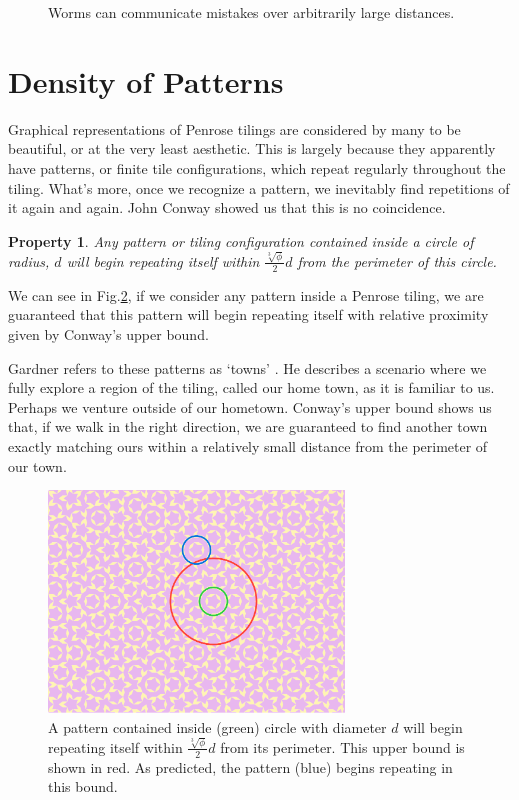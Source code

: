 \documentclass[
  oneside,
  11pt, a4paper,
  footinclude=true,
  headinclude=true,
  cleardoublepage=empty
]{scrbook}
\newtheorem{myprop}{Property}
\begin{document}
\begin{figure}[H]
\caption[Worms Communicate Mistakes]{Worms can communicate mistakes over arbitrarily large distances.}
\label{fig:wormmistakes}
\end{figure}

\section{Density of Patterns}
Graphical representations of Penrose tilings are considered by many to be beautiful, or at the very least aesthetic. This is largely because they apparently have patterns, or finite tile configurations, which repeat regularly throughout the tiling. What's more, once we recognize a pattern, we inevitably find repetitions of it again and again. John Conway showed us that this is no coincidence.

\begin{myprop}
Any pattern or tiling configuration contained inside a circle of radius, $d$ will begin repeating itself within $\frac{\sqrt[3]{\phi}}{2}d$ from the perimeter of this circle. \cite{Gardner1997}
\end{myprop}

We can see in Fig.\ref{fig:patternfind}, if we consider any pattern inside a Penrose tiling, we are guaranteed that this pattern will begin repeating itself with relative proximity given by Conway's upper bound. 

Gardner refers to these patterns as `towns' \cite{Gardner1997}. He describes a scenario where we fully explore a region of the tiling, called our home town, as it is familiar to us. Perhaps we venture outside of our hometown. Conway's upper bound shows us that, if we walk in the right direction, we are guaranteed to find another town exactly matching ours within a relatively small distance from the perimeter of our town.

\begin{figure}
\centering
\includegraphics[width=0.7\textwidth]{PatternFind3}
\caption[Upper Bound for Pattern Density]{A pattern contained inside (green) circle with diameter $d$ will begin repeating itself within $\frac{\sqrt[3]{\phi}}{2}d$ from its perimeter. This upper bound is shown in red. As predicted, the pattern (blue) begins repeating in this bound.}
\label{fig:patternfind}
\end{figure}
\end{document}
